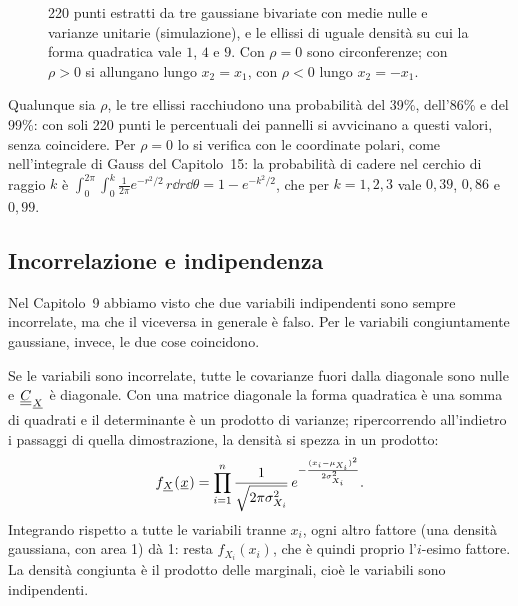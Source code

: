 \begin{figure}[H]
\caption{220 punti estratti da tre gaussiane bivariate con medie nulle e varianze unitarie (simulazione), e le ellissi
di uguale densità su cui la forma quadratica vale $1$, $4$ e $9$. Con $\rho = 0$ sono circonferenze; con $\rho > 0$ si
allungano lungo $x_2 = x_1$, con $\rho < 0$ lungo $x_2 = -x_1$.}
\end{figure}

Qualunque sia $\rho$, le tre ellissi racchiudono una probabilità del 39\%, dell'86\% e del 99\%: con soli 220 punti le
percentuali dei pannelli si avvicinano a questi valori, senza coincidere. Per $\rho = 0$ lo si verifica con le coordinate
polari, come nell'integrale di Gauss del Capitolo~15: la probabilità di cadere nel cerchio di raggio $k$ è
$\int_0^{2\pi} \int_0^k \frac{1}{2\pi} e^{-r^2/2}\, r \dd r \dd\theta = 1 - e^{-k^2/2}$, che per $k = 1, 2, 3$ vale
$0{,}39$, $0{,}86$ e $0{,}99$.

\subsection{Incorrelazione e indipendenza}

Nel Capitolo~9 abbiamo visto che due variabili indipendenti sono sempre incorrelate, ma che il viceversa in generale è
falso. Per le variabili congiuntamente gaussiane, invece, le due cose coincidono.


\begin{dimostrazione}
 Se le variabili sono incorrelate, tutte le covarianze fuori dalla diagonale sono nulle e
${\mkern1mu\underline{\underline{C}}\mkern1mu}_{{\mkern1mu\underline{X}\mkern1mu}}$ è diagonale.
 Con una matrice diagonale la forma quadratica è una somma
di quadrati e il determinante è un prodotto di varianze; ripercorrendo all'indietro i passaggi di quella dimostrazione,
la densità si spezza in un prodotto:
\[ f_{{\mkern1mu\underline{X}\mkern1mu}}({\mkern1mu\underline{x}\mkern1mu}) = \prod_{i=1}^{n} \frac{1}{\sqrt{2\pi\sigma_{X_i}^2}}\, e^{-\frac{(x_i - \mu_{X_i})^2}{2
   \sigma_{X_i}^2}} . \]
 Integrando rispetto a tutte le variabili tranne $x_i$, ogni altro fattore (una
densità gaussiana, con area 1) dà 1: resta $f_{X_i}(x_i)$, che è quindi proprio l'$i$-esimo fattore. La densità
congiunta è il prodotto delle marginali, cioè le variabili sono indipendenti.
\end{dimostrazione}

